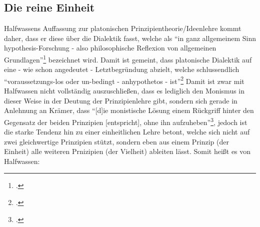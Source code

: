 \subsection{Die reine Einheit}
Halfwassens Auffassung zur platonischen Prinzipientheorie/Ideenlehre kommt daher, dass er diese über die Dialektik fasst, welche als \enquote{in ganz allgemeinem Sinn hypothesis-Forschung - also philosophische Reflexion von allgemeinen Grundlagen}\footcite[][S. 94]{halfwassen2015spuren} bezeichnet wird. Damit ist gemeint, dass platonische Dialektik auf eine - wie schon angedeutet - Letztbegründung abzielt, welche schlussendlich \enquote{voraussetzungs-los oder un-bedingt - anhypothetos - ist}\footcite[][S. 95]{halfwassen2015spuren}
Damit ist zwar mit Halfwassen nicht vollständig auszuschließen, dass es lediglich den Monismus in dieser Weise in der Deutung der Prinzipienlehre gibt, sondern sich gerade in Anlehnung an Krämer, dass \enquote{[d]ie monistische Lösung einem Rückgriff hinter den Gegensatz der beiden Prinzipien [entspricht], ohne ihn aufzuheben}\footcite[vgl.][S. 333]{Krämer1964Geistmetaphysik}, jedoch ist die starke Tendenz hin zu einer einheitlichen Lehre betont, welche sich nicht auf zwei gleichwertige Prinzipien stützt, sondern eben aus einem Prinzip (der Einheit) alle weiteren Prnizipien (der Vielheit) ableiten lässt. Somit heißt es von Halfwassen:
